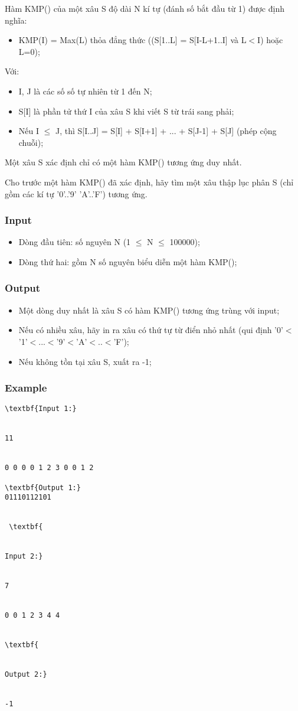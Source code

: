 



   Hàm KMP() của một xâu S độ dài N kí tự (đánh số bắt đầu từ 1) được định nghĩa:  
\begin{itemize}
	\item     KMP(I) = Max(L) thỏa đẳng thức ((S[1..L] = S[I-L+1..I] và L$<$I) hoặc L=0);   
\end{itemize}

   Với:  
\begin{itemize}
	\item     I, J là các số số tự nhiên từ 1 đến N;   
	\item     S[I] là phần tử thứ I của xâu S khi viết S từ trái sang phải;   
	\item     Nếu I $\le$ J, thì S[I..J] = S[I] + S[I+1] + ... + S[J-1] + S[J] (phép cộng chuỗi);   
\end{itemize}

   Một xâu S xác định chỉ có một hàm KMP() tương ứng duy nhất.  

   Cho trước một hàm KMP() đã xác định, hãy tìm một xâu thập lục phân S (chỉ gồm các kí tự '0'..'9' 'A'..'F') tương ứng.  

\subsubsection{   Input  }
\begin{itemize}
	\item     Dòng đầu tiên: số nguyên N (1  $\le$  N  $\le$  100000);   
	\item     Dòng thứ hai: gồm N số nguyên biểu diễn một hàm KMP();   
\end{itemize}

\subsubsection{   Output  }
\begin{itemize}
	\item     Một dòng duy nhất là xâu S có hàm KMP() tương ứng trùng với input;   
	\item     Nếu có nhiều xâu, hãy in ra xâu có thứ tự từ điển nhỏ nhất (qui định '0'$<$'1'$<$...$<$'9'$<$'A'$<$..$<$'F');   
	\item     Nếu không tồn tại xâu S, xuất ra -1;   
\end{itemize}

\subsubsection{   Example  }
\begin{verbatim}
\textbf{Input 1:}


11


0 0 0 0 1 2 3 0 0 1 2

\textbf{Output 1:}
01110112101


 \textbf{


Input 2:}


7


0 0 1 2 3 4 4


\textbf{


Output 2:}


-1\end{verbatim}
